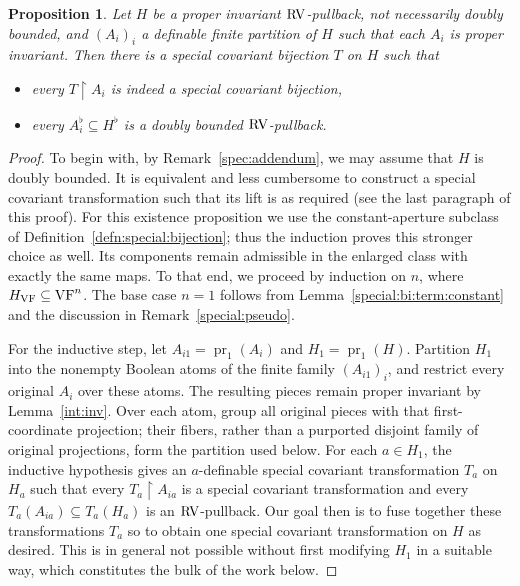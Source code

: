\documentclass[12pt]{amsart}
\theoremstyle{plain}
\newtheorem{prop}[thm]{Proposition}
\theoremstyle{definition}
\theoremstyle{remark}
\numberwithin{equation}{section}
\theoremstyle{plain}
\newcommand{\VF}{\textup{VF}}
\newcommand{\RV}{\textup{RV}}
\DeclareMathOperator{\pr}{pr}
\newcommand{\0}{\emptyset}
\newcommand{\rest}{\upharpoonright}
\newcommand{\sub}{\subseteq}
\DeclareMathOperator{\rv}{rv}
\begin{document}
\begin{prop}\label{simplex:with:hole:rvproduct}
Let $H$ be a proper invariant $\RV$-pullback, not necessarily doubly bounded, and $(A_i)_i$ a definable finite partition of $H$ such that each $A_i$ is proper invariant. Then there is a special covariant bijection $T$ on $H$ such that
\begin{itemize}
  \item every $T \rest A_i$ is indeed a special covariant bijection,
  \item every $A_i^{\flat} \sub H^{\flat}$  is a doubly bounded $\RV$-pullback.
\end{itemize}
\end{prop}
\begin{proof}
To begin with, by Remark~\ref{spec:addendum}, we may assume that $H$ is doubly bounded. It is equivalent and less cumbersome to construct a special covariant transformation such that its lift is as required (see the last paragraph of this proof). For this existence proposition we use the constant-aperture subclass of Definition~\ref{defn:special:bijection}; thus the induction proves this stronger choice as well. Its components remain admissible in the enlarged class with exactly the same maps. To that end, we proceed by induction on $n$, where $H_{\VF} \sub \VF^n$. The base case $n=1$ follows from Lemma~\ref{special:bi:term:constant} and the discussion in Remark~\ref{special:pseudo}.


For the inductive step, let $A_{i1} = \pr_1(A_i)$ and $H_1 = \pr_1(H)$. Partition $H_1$ into the nonempty Boolean atoms of the finite family $(A_{i1})_i$, and restrict every original $A_i$ over these atoms. The resulting pieces remain proper invariant by Lemma~\ref{int:inv}. Over each atom, group all original pieces with that first-coordinate projection; their fibers, rather than a purported disjoint family of original projections, form the partition used below. For each $a \in H_1$, the inductive hypothesis gives an $a$-definable special covariant transformation $T_a$ on $H_a$ such that every $T_a \rest A_{ia}$ is a special covariant transformation and every $T_a(A_{ia}) \sub T_a(H_a)$ is an $\RV$-pullback. Our goal then is to fuse together these transformations $T_a$ so to obtain one special covariant transformation on $H$ as desired. This is in general not possible without first modifying $H_1$ in a suitable way, which constitutes the bulk of the work below.


\end{proof}
\end{document}
